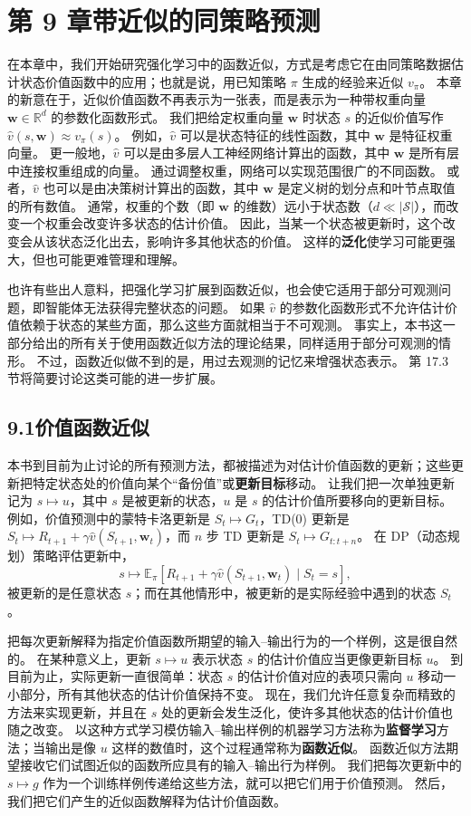 \documentclass[UTF8,12pt,a4paper,fontset=fandol]{ctexart}
\begin{document}
\section*{第 9 章\quad 带近似的同策略预测}

在本章中，我们开始研究强化学习中的函数近似，方式是考虑它在由同策略数据估计状态价值函数中的应用；也就是说，用已知策略 $\pi$ 生成的经验来近似 $v_\pi$。
本章的新意在于，近似价值函数不再表示为一张表，而是表示为一种带权重向量 $\mathbf{w}\in\mathbb{R}^d$ 的参数化函数形式。
我们把给定权重向量 $\mathbf{w}$ 时状态 $s$ 的近似价值写作 $\hat{v}(s,\mathbf{w})\approx v_\pi(s)$。
例如，$\hat{v}$ 可以是状态特征的线性函数，其中 $\mathbf{w}$ 是特征权重向量。
更一般地，$\hat{v}$ 可以是由多层人工神经网络计算出的函数，其中 $\mathbf{w}$ 是所有层中连接权重组成的向量。
通过调整权重，网络可以实现范围很广的不同函数。
或者，$\hat{v}$ 也可以是由决策树计算出的函数，其中 $\mathbf{w}$ 是定义树的划分点和叶节点取值的所有数值。
通常，权重的个数（即 $\mathbf{w}$ 的维数）远小于状态数（$d\ll|\mathcal{S}|$），而改变一个权重会改变许多状态的估计价值。
因此，当某一个状态被更新时，这个改变会从该状态泛化出去，影响许多其他状态的价值。
这样的\textbf{泛化}使学习可能更强大，但也可能更难管理和理解。

也许有些出人意料，把强化学习扩展到函数近似，也会使它适用于部分可观测问题，即智能体无法获得完整状态的问题。
如果 $\hat{v}$ 的参数化函数形式不允许估计价值依赖于状态的某些方面，那么这些方面就相当于不可观测。
事实上，本书这一部分给出的所有关于使用函数近似方法的理论结果，同样适用于部分可观测的情形。
不过，函数近似做不到的是，用过去观测的记忆来增强状态表示。
第 17.3 节将简要讨论这类可能的进一步扩展。

\subsection*{9.1\quad 价值函数近似}

本书到目前为止讨论的所有预测方法，都被描述为对估计价值函数的更新；这些更新把特定状态处的价值向某个“备份值”或\textbf{更新目标}移动。
让我们把一次单独更新记为 $s\mapsto u$，其中 $s$ 是被更新的状态，$u$ 是 $s$ 的估计价值所要移向的更新目标。
例如，价值预测中的蒙特卡洛更新是 $S_t\mapsto G_t$，TD(0) 更新是 $S_t\mapsto R_{t+1}+\gamma\hat{v}(S_{t+1},\mathbf{w}_t)$，而 $n$ 步 TD 更新是 $S_t\mapsto G_{t:t+n}$。
在 DP（动态规划）策略评估更新中，
\[
s\mapsto \mathbb{E}_\pi\!\left[R_{t+1}+\gamma\hat{v}(S_{t+1},\mathbf{w}_t)\mid S_t=s\right],
\]
被更新的是任意状态 $s$；而在其他情形中，被更新的是实际经验中遇到的状态 $S_t$。

把每次更新解释为指定价值函数所期望的输入--输出行为的一个样例，这是很自然的。
在某种意义上，更新 $s\mapsto u$ 表示状态 $s$ 的估计价值应当更像更新目标 $u$。
到目前为止，实际更新一直很简单：状态 $s$ 的估计价值对应的表项只需向 $u$ 移动一小部分，所有其他状态的估计价值保持不变。
现在，我们允许任意复杂而精致的方法来实现更新，并且在 $s$ 处的更新会发生泛化，使许多其他状态的估计价值也随之改变。
以这种方式学习模仿输入--输出样例的机器学习方法称为\textbf{监督学习}方法；当输出是像 $u$ 这样的数值时，这个过程通常称为\textbf{函数近似}。
函数近似方法期望接收它们试图近似的函数所应具有的输入--输出行为样例。
我们把每次更新中的 $s\mapsto g$ 作为一个训练样例传递给这些方法，就可以把它们用于价值预测。
然后，我们把它们产生的近似函数解释为估计价值函数。
\end{document}
